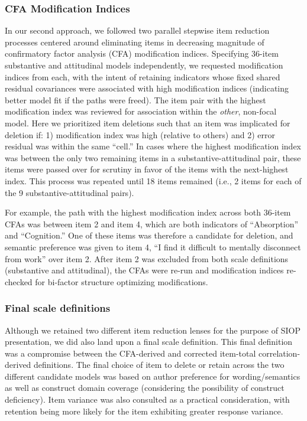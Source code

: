 \documentclass[
  english,
  man]{apa7}
\begin{document}
\hypertarget{cfa-modification-indices}{%
\subsubsection{CFA Modification Indices}\label{cfa-modification-indices}}

In our second approach, we followed two parallel stepwise item reduction processes centered around eliminating items in decreasing magnitude of confirmatory factor analysis (CFA) modification indices. Specifying 36-item substantive and attitudinal models independently, we requested modification indices from each, with the intent of retaining indicators whose fixed shared residual covariances were associated with high modification indices (indicating better model fit if the paths were freed). The item pair with the highest modification index was reviewed for association within the \emph{other}, non-focal model. Here we prioritized item deletions such that an item was implicated for deletion if: 1) modification index was high (relative to others) and 2) error residual was within the same ``cell.'' In cases where the highest modification index was between the only two remaining items in a substantive-attitudinal pair, these items were passed over for scrutiny in favor of the items with the next-highest index. This process was repeated until 18 items remained (i.e., 2 items for each of the 9 substantive-attitudinal pairs).

For example, the path with the highest modification index across both 36-item CFAs was between item 2 and item 4, which are both indicators of ``Absorption'' and ``Cognition.'' One of these items was therefore a candidate for deletion, and semantic preference was given to item 4, ``I find it difficult to mentally disconnect from work'' over item 2. After item 2 was excluded from both scale definitions (substantive and attitudinal), the CFAs were re-run and modification indices re-checked for bi-factor structure optimizing modifications.

\hypertarget{final-scale-definitions}{%
\subsubsection{Final scale definitions}\label{final-scale-definitions}}

Although we retained two different item reduction lenses for the purpose of SIOP presentation, we did also land upon a final scale definition. This final definition was a compromise between the CFA-derived and corrected item-total correlation-derived definitions. The final choice of item to delete or retain across the two different candidate models was based on author preference for wording/semantics as well as construct domain coverage (considering the possibility of construct deficiency). Item variance was also consulted as a practical consideration, with retention being more likely for the item exhibiting greater response variance.
\end{document}
